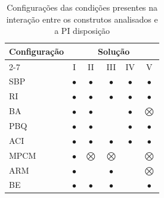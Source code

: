 \begin{table}[H]
\centering
\caption{Configurações das condições presentes na interação entre os construtos analisados e a PI disposição}
\label{tab:16}
\begin{tabular}{lcccccl}
\hline
\multicolumn{1}{c}{\multirow{2}{*}{Configuração}} & \multicolumn{6}{c}{Solução}                                                                                           \\ \cline{2-7} 
\multicolumn{1}{c}{}                              & I                    & II                   & III                  & IV                   & \multicolumn{2}{c}{V}     \\ \hline
SBP                                               & $\bullet$                    & $\bullet$                    & $\bullet$                    & $\bullet$                    & \multicolumn{2}{c}{$\bullet$}     \\
RI                                                & $\bullet$                    & $\bullet$                    & $\bullet$                    & $\bullet$                    & \multicolumn{2}{c}{$\bullet$}     \\
BA                                                & $\bullet$                    & $\bullet$                    &                      & $\bullet$                    & \multicolumn{2}{c}{$\bigotimes$}     \\
PBQ                                               & $\bullet$                    & $\bullet$                    &                      & $\bullet$                    & \multicolumn{2}{c}{$\bullet$}     \\
ACI                                               & $\bullet$                    & $\bullet$                    & $\bullet$                    & $\bullet$                    & \multicolumn{2}{c}{$\bullet$}     \\
MPCM                                              & $\bullet$                    & $\bigotimes$                    & $\bigotimes$                    &                      & \multicolumn{2}{c}{$\bigotimes$}     \\
ARM                                               & $\bullet$                    &                      & $\bullet$                    &                      & \multicolumn{2}{c}{$\bigotimes$}     \\
BE                                                & $\bullet$                    & $\bullet$                    & $\bullet$                    &                      & \multicolumn{2}{c}{$\bullet$}     \\

\end{tabular}
\end{table}
